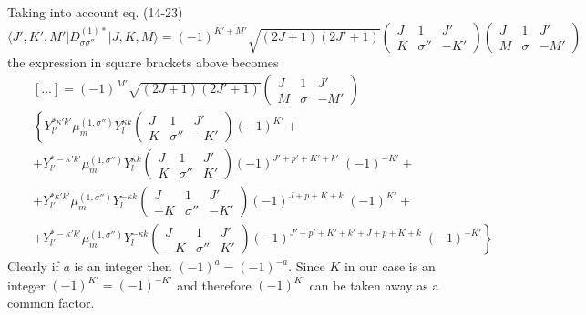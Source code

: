 Taking into account eq. (14-23) \cite{Bunker}
\begin{equation}
\langle J',K',M' \vert D^{(1)*}_{\sigma \sigma''} \vert J,K,M \rangle =
(-1)^{K'+M'} \sqrt{(2J+1)(2J'+1)} 
\left( \begin{array}{ccc} 
J &        1 & J' \\
K & \sigma'' & -K'  \end{array} \right)
\left( \begin{array}{ccc} 
J &      1 & J' \\
M & \sigma & -M'  \end{array} \right)
\end{equation}
the expression in square brackets above becomes
\begin{eqnarray}  \nonumber &&
[...] = (-1)^{M'} \sqrt{(2J+1)(2J'+1)} 
\left( \begin{array}{ccc} 
J &      1 & J' \\
M & \sigma & -M'  \end{array} \right)
\\ \nonumber &&
 \left\{
 Y^{* \kappa' k'}_{l'} \mu^{(1,\sigma'')}_m Y^{\kappa k}_{l} 
\left( \begin{array}{ccc} 
J &        1 & J' \\
K & \sigma'' & -K'  \end{array} \right) (-1)^{K'} +
\right.
\\ \nonumber &&
 + Y^{* - \kappa' k'}_{l'} \mu^{(1,\sigma'')}_m Y^{\kappa k}_{l} 
\left( \begin{array}{ccc} 
J &        1 & J' \\
K & \sigma'' & K'  \end{array} \right) (-1)^{J'+p'+K'+k'} \; (-1)^{-K'} +
\\ \nonumber &&
 + Y^{* \kappa' k'}_{l'} \mu^{(1,\sigma'')}_m Y^{-\kappa k}_{l} 
\left( \begin{array}{ccc} 
 J &        1 & J' \\
-K & \sigma'' & -K'  \end{array} \right) (-1)^{J+p+K+k} \; (-1)^{K'} +
\\           &&
\left. + Y^{* -\kappa' k'}_{l'} \mu^{(1,\sigma'')}_m Y^{-\kappa k}_{l} 
\left( \begin{array}{ccc} 
 J &        1 & J' \\
-K & \sigma'' & K'  \end{array} \right) (-1)^{J'+p'+K'+k'+J+p+K+k} \; (-1)^{-K'} \right\}
\end{eqnarray}
Clearly if $a$ is an integer then $(-1)^{a} = (-1)^{-a}$. 
Since $K$ in our case is an integer $(-1)^{K'} = (-1)^{-K'}$ and 
therefore $(-1)^{K'}$ can be taken away as a common factor.


